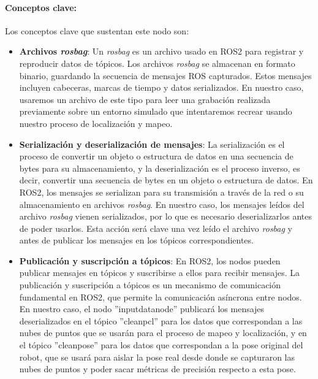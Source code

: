 \documentclass[12pt, a4paper, twoside]{article}
\begin{document}
\paragraph{Conceptos clave:}
Los conceptos clave que sustentan este nodo son:
\begin{itemize}
  \item \textbf{Archivos \textit{rosbag}}: Un \textit{rosbag} es un archivo usado en ROS2\cite{doi:10.1126/scirobotics.abm6074} para registrar y reproducir datos de tópicos. Los 
  archivos \textit{rosbag} se almacenan en formato binario, guardando la secuencia de mensajes ROS capturados. Estos mensajes incluyen cabeceras, marcas de tiempo 
  y datos serializados. En nuestro caso, usaremos un archivo de este tipo para leer una grabación realizada previamente sobre un entorno simulado que 
  intentaremos recrear usando nuestro proceso de localización y mapeo.
  \item \textbf{Serialización y deserialización de mensajes}: La serialización es el proceso de convertir un objeto o estructura de datos en una secuencia 
  de bytes para su almacenamiento, y la deserialización es el proceso inverso, es decir, convertir una secuencia de bytes en un objeto o estructura de datos. 
  En ROS2\cite{doi:10.1126/scirobotics.abm6074}, los mensajes se serializan para su transmisión a través de la red o su almacenamiento en archivos \textit{rosbag}. En nuestro caso, los mensajes leídos del 
  archivo \textit{rosbag} vienen serializados, por lo que es necesario deserializarlos antes de poder usarlos. Esta acción será clave una vez leído el archivo \textit{rosbag} 
  y antes de publicar los mensajes en los tópicos correspondientes.
  \item \textbf{Publicación y suscripción a tópicos}: En ROS2\cite{doi:10.1126/scirobotics.abm6074}, los nodos pueden publicar mensajes en tópicos y suscribirse a ellos para recibir mensajes.
  La publicación y suscripción a tópicos es un mecanismo de comunicación fundamental en ROS2\cite{doi:10.1126/scirobotics.abm6074}, que permite la comunicación asíncrona entre nodos. En nuestro caso, 
  el nodo ''input\textunderscore data\textunderscore node'' publicará los mensajes deserializados en el tópico ''clean\textunderscore pcl'' para los datos que 
  correspondan a las nubes de puntos que se usarán para el proceso de mapeo y localización, y en el tópico ''clean\textunderscore pose'' para los datos que correspondan 
  a la pose original del robot, que se usará para aislar la pose real desde donde se capturaron las nubes de puntos y poder sacar métricas de precisión respecto a 
  esta pose.  
\end{itemize}
\end{document}
